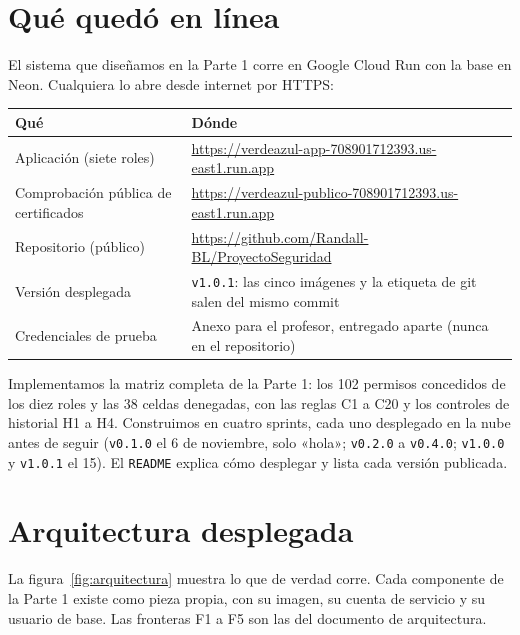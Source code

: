 \documentclass[11pt,letterpaper]{article}
\newcommand{\cab}[1]{\textbf{\rmfamily #1}}
\newcommand{\cod}[1]{\texttt{\small #1}}
\begin{document}
\section{Qué quedó en línea}

El sistema que diseñamos en la Parte 1 corre en Google Cloud Run con la base en Neon. Cualquiera lo abre desde internet por HTTPS:

\begin{center}
\small
\begin{tabularx}{\textwidth}{@{}L{4.2cm} Y@{}}
\toprule
\cab{Qué} & \cab{Dónde} \\
\midrule
Aplicación (siete roles) & \url{https://verdeazul-app-708901712393.us-east1.run.app} \\
Comprobación pública de certificados & \url{https://verdeazul-publico-708901712393.us-east1.run.app} \\
Repositorio (público) & \url{https://github.com/Randall-BL/ProyectoSeguridad} \\
Versión desplegada & \cod{v1.0.1}: las cinco imágenes y la etiqueta de git salen del mismo commit \\
Credenciales de prueba & Anexo para el profesor, entregado aparte (nunca en el repositorio) \\
\bottomrule
\end{tabularx}
\end{center}

Implementamos la matriz completa de la Parte 1: los 102 permisos concedidos de los diez roles y las 38 celdas denegadas, con las reglas C1 a C20 y los controles de historial H1 a H4. Construimos en cuatro sprints, cada uno desplegado en la nube antes de seguir (\cod{v0.1.0} el 6 de noviembre, solo
«hola»; \cod{v0.2.0} a \cod{v0.4.0}; \cod{v1.0.0} y \cod{v1.0.1} el 15). El \cod{README} explica cómo desplegar y
lista cada versión publicada.

\section{Arquitectura desplegada}

La figura~\ref{fig:arquitectura} muestra lo que de verdad corre. Cada componente de la Parte 1 existe como pieza propia, con su imagen, su cuenta de servicio y su usuario de base. Las fronteras F1 a F5 son las del documento de arquitectura.
\end{document}
